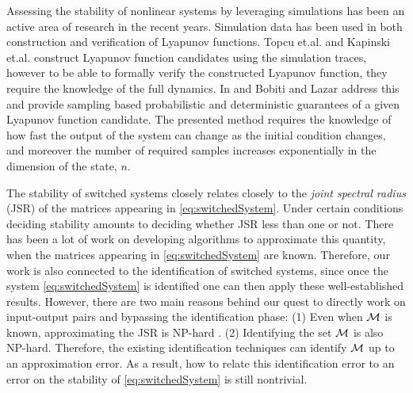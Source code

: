 Assessing the stability of nonlinear systems by leveraging simulations has been an active area of research in the recent years. Simulation data has been used in both construction and verification of Lyapunov functions. Topcu et.al. \cite{topcu} and Kapinski et.al. \cite{kapinski} construct Lyapunov function candidates using the simulation traces, however to be able to formally verify the constructed Lyapunov function, they require the knowledge of the full dynamics. In \cite{lazar} and \cite{lazar2} Bobiti and Lazar address this and provide sampling based probabilistic and deterministic guarantees of a given Lyapunov function candidate. The presented method requires the knowledge of how fast the output of the system can change as the initial condition changes, and moreover the number of required samples increases exponentially in the dimension of the state, $n$.

The stability of switched systems closely relates closely to the \emph{joint spectral radius} (JSR) of the matrices appearing in \eqref{eq:switchedSystem}. Under certain conditions deciding stability amounts to deciding whether JSR less than one or not. There has been a lot of work on developing algorithms to approximate this quantity, when the matrices appearing in \eqref{eq:switchedSystem} are known. Therefore, our work is also connected to the identification of switched systems, since once the system \eqref{eq:switchedSystem} is identified one can then apply these well-established results. However, there are two main reasons behind our quest to directly work on input-output pairs and bypassing the identification phase: (1) Even when $\mathcal{M}$ is known, approximating the JSR is NP-hard \cite{jungers}. (2) Identifying the set $\mathcal{M}$ is also NP-hard. Therefore, the existing identification techniques can identify $\mathcal{M}$ up to an approximation error. As a result, how to relate this identification error to an error on the stability of \eqref{eq:switchedSystem} is still nontrivial.

